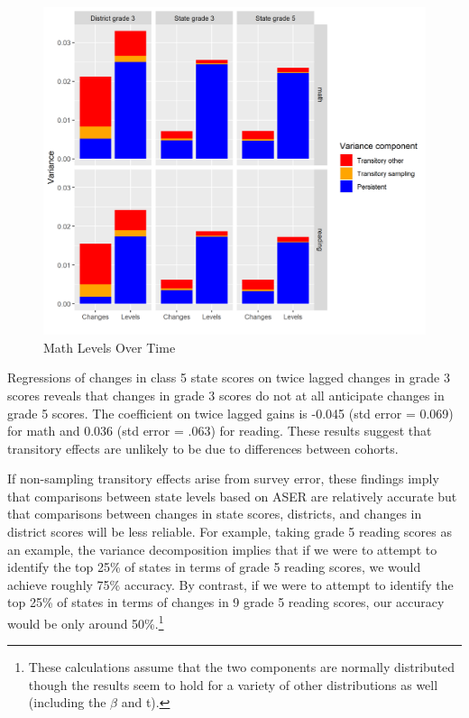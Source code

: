 \documentclass[
  11pt,
]{article}
\begin{document}
\begin{figure}

{\centering \includegraphics[width=0.9\linewidth]{Combined bar chart} 

}

\caption{Math Levels Over Time}\label{fig:combinedbarchart}
\end{figure}

Regressions of changes in class 5 state scores on twice lagged changes in grade 3 scores reveals that changes in grade 3 scores do not at all anticipate changes in grade 5 scores. The coefficient on twice lagged gains is -0.045 (std error = 0.069) for math and 0.036 (std error = .063) for reading. These results suggest that transitory effects are unlikely to be due to differences between cohorts.

If non-sampling transitory effects arise from survey error, these findings imply that comparisons between state levels based on ASER are relatively accurate but that comparisons between changes in state scores, districts, and changes in district scores will be less reliable. For example, taking grade 5 reading scores as an example, the variance decomposition implies that if we were to attempt to identify the top 25\% of states in terms of grade 5 reading scores, we would achieve roughly 75\% accuracy. By contrast, if we were to attempt to identify the top 25\% of states in terms of changes in
9 grade 5 reading scores, our accuracy would be only around 50\%.\footnote{These calculations assume that the two components are normally distributed though the results seem to hold for a variety of other distributions as well (including the \(\beta\) and t).}
\end{document}
